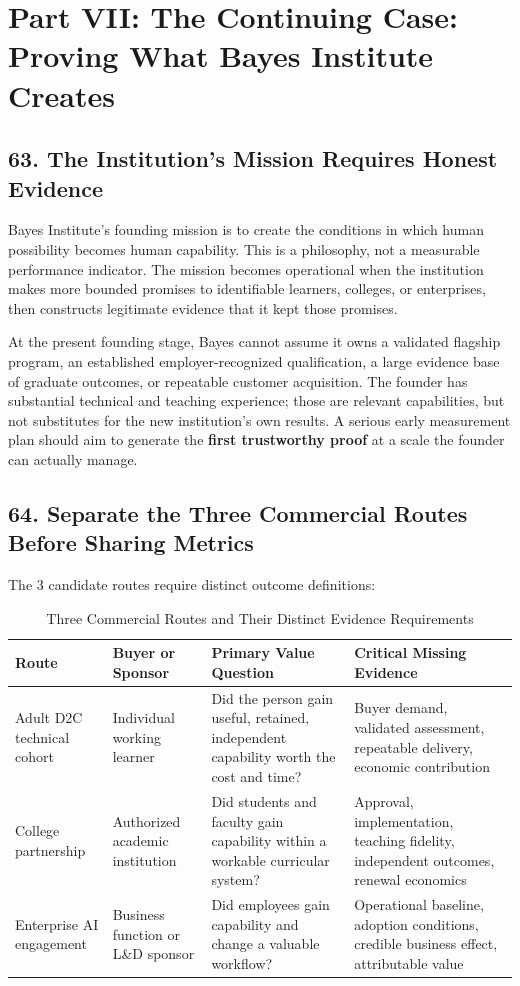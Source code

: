 \section*{Part VII: The Continuing Case: Proving What Bayes Institute Creates}

\subsection*{63. The Institution's Mission Requires Honest Evidence}

Bayes Institute's founding mission is to create the conditions in which human possibility becomes human capability. This is a philosophy, not a measurable performance indicator. The mission becomes operational when the institution makes more bounded promises to identifiable learners, colleges, or enterprises, then constructs legitimate evidence that it kept those promises.

At the present founding stage, Bayes cannot assume it owns a validated flagship program, an established employer-recognized qualification, a large evidence base of graduate outcomes, or repeatable customer acquisition. The founder has substantial technical and teaching experience; those are relevant capabilities, but not substitutes for the new institution's own results. A serious early measurement plan should aim to generate the \textbf{first trustworthy proof} at a scale the founder can actually manage.

\subsection*{64. Separate the Three Commercial Routes Before Sharing Metrics}

The 3 candidate routes require distinct outcome definitions:

\begin{table}[t]
\centering
\small
\caption{Three Commercial Routes and Their Distinct Evidence Requirements}
\begin{tabularx}{\textwidth}{p{}p{}p{}X}
\toprule
\textbf{Route} & \textbf{Buyer or Sponsor} & \textbf{Primary Value Question} & \textbf{Critical Missing Evidence} \\
\midrule
Adult D2C technical cohort & Individual working learner & Did the person gain useful, retained, independent capability worth the cost and time? & Buyer demand, validated assessment, repeatable delivery, economic contribution \\
College partnership & Authorized academic institution & Did students and faculty gain capability within a workable curricular system? & Approval, implementation, teaching fidelity, independent outcomes, renewal economics \\
Enterprise AI engagement & Business function or L\&D sponsor & Did employees gain capability and change a valuable workflow? & Operational baseline, adoption conditions, credible business effect, attributable value \\
\bottomrule
\end{tabularx}
\end{table}

